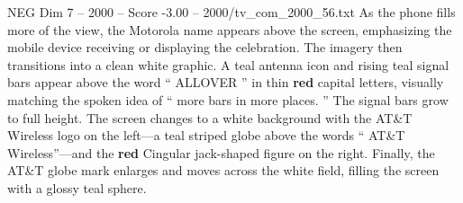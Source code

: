 \begin{textsample}{NEG Dim 7 – 2000 – Score -3.00 – 2000/tv\_com\_2000\_56.txt}
As the phone fills more of the view, the Motorola name appears above the screen, emphasizing the mobile device receiving or displaying the celebration.
The imagery then transitions into a clean white graphic.
A teal antenna icon and rising teal signal bars appear above the word “ ALLOVER ” in thin \textbf{red} capital letters, visually matching the spoken idea of “ more bars in more places. ” The signal bars grow to full height.
The screen changes to a white background with the AT\&T Wireless logo on the left—a teal striped globe above the words “ AT\&T Wireless”—and the \textbf{red} Cingular jack-shaped figure on the right.
Finally, the AT\&T globe mark enlarges and moves across the white field, filling the screen with a glossy teal sphere.

\end{textsample}
